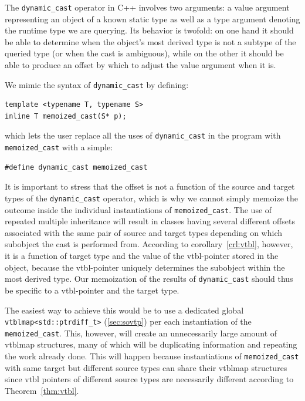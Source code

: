 \documentclass[preprint]{sigplanconf}
\makeatletter
\DeclareRobustCommand{\code}[1]{{\lstinline[breaklines=false,escapechar=@]{#1}}}
\makeatother
\begin{document}
The \code{dynamic_cast} operator in C++ involves two arguments: a value argument 
representing an object of a known static type as well as a type argument 
denoting the runtime type we are querying. Its behavior is twofold: on one hand 
it should be able to determine when the object's most derived type is not a 
subtype of the queried type (or when the cast is ambiguous), while on the other 
it should be able to produce an offset by which to adjust the value argument when it is.

We mimic the syntax of \code{dynamic_cast} by defining:

\begin{lstlisting}
template <typename T, typename S>
inline T memoized_cast(S* p);
\end{lstlisting}

\noindent
which lets the user replace all the uses of \code{dynamic_cast} in the program 
with \code{memoized_cast} with a simple:

\begin{lstlisting}
#define dynamic_cast memoized_cast
\end{lstlisting}

\noindent
It is important to stress that the offset is not a function of the source and target 
types of the \code{dynamic_cast} operator, which is why we cannot simply memoize the 
outcome inside the individual instantiations of \code{memoized_cast}.
The use of repeated multiple inheritance will result in classes having several 
different offsets associated with the same pair of source and target types 
depending on which subobject the cast is performed from. According to 
corollary~\ref{crl:vtbl}, however, it is a function of target type and the value 
of the vtbl-pointer stored in the object, because the vtbl-pointer uniquely 
determines the subobject within the most derived type. Our memoization of the 
results of \code{dynamic_cast} should thus be specific to a vtbl-pointer and the 
target type. 

The easiest way to achieve this would be to use a dedicated global
\code{vtblmap<std::ptrdiff_t>} (\textsection\ref{sec:sovtp}) per each 
instantiation of the \code{memoized_cast}. This, however, will create an 
unnecessarily large amount of vtblmap structures, many of which will be  
duplicating information and repeating the work already done. This will happen 
because instantiations of \code{memoized_cast} with same target but different 
source types can share their vtblmap structures since vtbl pointers of different 
source types are necessarily different according to Theorem~\ref{thm:vtbl}. 
\end{document}
